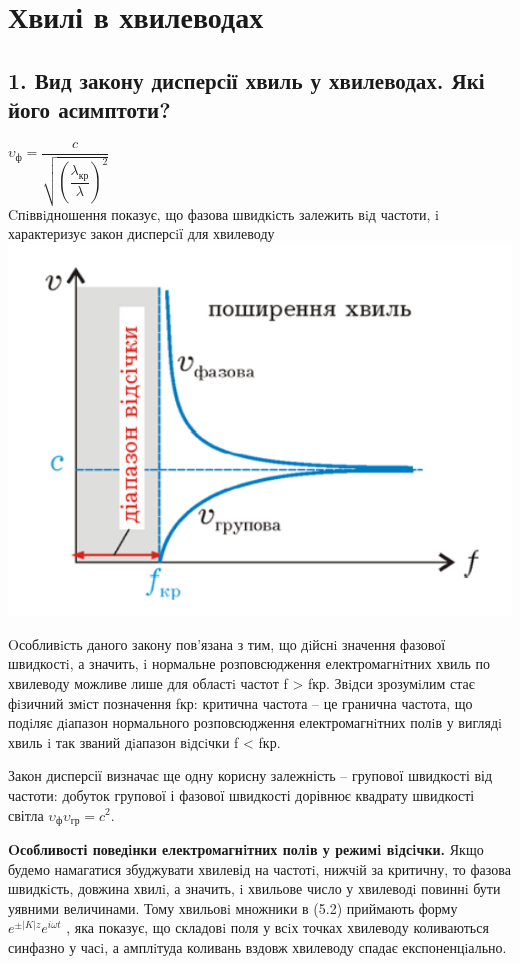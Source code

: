 \documentclass[a4paper,14pt]{extreport}
\begin{document}
\tableofcontents

\chapter{Хвилі в хвилеводах}
\section{1. Вид закону дисперсії хвиль у хвилеводах. Які його асимптоти?}
\begin{center}

$\upsilon_{\text{ф}} = \dfrac{c}{\sqrt{(\dfrac{\lambda_{\text{кр}}}{\lambda})^2}}$\\

Cпiввiдношення показує, що фазова швидкiсть
залежить вiд частоти, i характеризує закон дисперсiї для хвилеводу
\includegraphics[scale=0.7]{1.png}
\end{center}\par
Oсобливiсть даного закону пов'язана з тим, що
дiйснi значення фазової швидкостi, а значить, i
нормальне розповсюдження електромагнiтних хвиль по
хвилеводу можливе лише для областi частот f > fкр. Звiдси зрозумiлим стає фiзичний змiст позначення fкр: критична частота – це гранична частота, що подiляє дiапазон нормального розповсюдження електромагнiтних полiв у виглядi хвиль i так званий дiапазон вiдсiчки f < fкр.\par
Закон дисперсії визначає ще одну корисну залежність –
групової швидкості від частоти: добуток групової і фазової
швидкості дорівнює квадрату швидкості світла $\upsilon_{\text{ф}}\upsilon_{\text{гр}} = c^2$.\par
\textbf{Oсобливості поведiнки електромагнiтних полiв у режимi
вiдсiчки.} Якщо будемо намагатися збуджувати хвилевід на частотi,
нижчiй за критичну, то фазова швидкiсть,
довжина хвилi, а значить, i хвильове число у хвилеводi повиннi бути
уявними величинами. Тому хвильовi множники в (5.2) приймають
форму $e^{\pm|K|z} e^{i\omega t}$
, яка показує, що складовi поля у всiх точках
хвилеводу коливаються синфазно у часi, а амплiтуда коливань
вздовж хвилеводу спадає експоненцiально.
\end{document}
